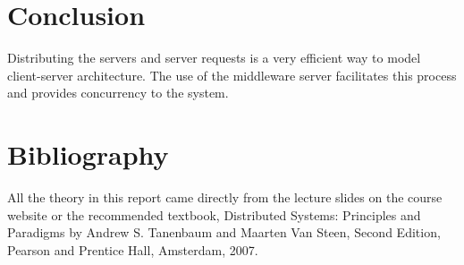 \documentclass[letterpaper,12pt]{article}
\begin{document}
\section{Conclusion}

Distributing the servers and server requests is a very efficient way to model client-server architecture. The use of the middleware server facilitates this process and provides concurrency to the system. 

\section{Bibliography}

All the theory in this report came directly from the lecture slides on the course website or the recommended textbook, Distributed Systems: Principles and Paradigms by Andrew S. Tanenbaum and Maarten Van Steen, Second Edition, Pearson and Prentice Hall, Amsterdam, 2007. 
\end{document}

